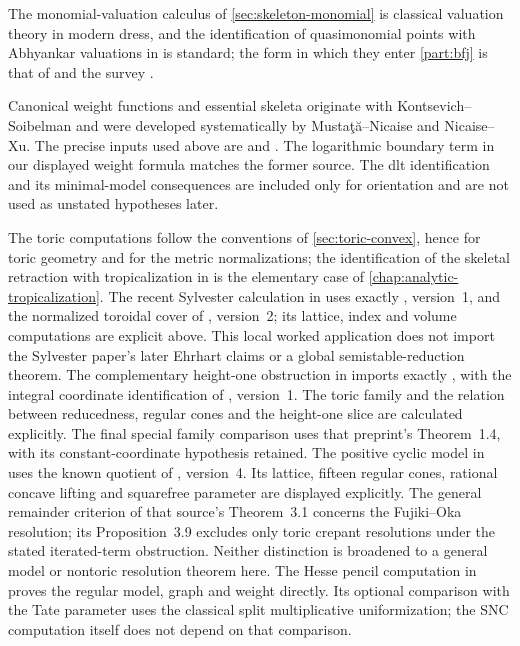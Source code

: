 The monomial-valuation calculus of \cref{sec:skeleton-monomial} is classical
valuation theory in modern dress, and the identification of quasimonomial
points with Abhyankar valuations in
 is standard; the form in which they
enter \cref{part:bfj} is that of \cite{BFJ15,BFJ16} and the survey
\cite{BFJ16b}.

Canonical weight functions and essential skeleta originate with
Kontsevich--Soibelman and were developed systematically by
Musta\c{t}\u{a}--Nicaise and Nicaise--Xu.  The precise inputs used above are
\cite[Proposition~4.4.3, Theorem~4.7.5, Definition~4.10, and
Proposition~4.10.1]{MustataNicaise2015} and
\cite[Theorem~3.3.3]{NicaiseXu2016}.  The logarithmic boundary term in our
displayed weight formula matches the former source.  The dlt identification
and its minimal-model consequences are included only for orientation and are
not used as unstated hypotheses later.

The toric computations follow the conventions of \cref{sec:toric-convex},
hence \cite{CLS11} for toric geometry and \cite{BGPS14} for the metric
normalizations; the identification of the skeletal retraction with
tropicalization in  is the elementary case of
\cref{chap:analytic-tropicalization}.
The recent Sylvester calculation in 
uses exactly \cite[Theorem~3.5]{CCJP26Sylvester}, version~1, and the
normalized toroidal cover of
\cite[Proposition~3.7]{AmbroCyclicV2}, version~2; its lattice, index
and volume computations are explicit above. This local worked application
does not import the Sylvester paper's later Ehrhart claims or a global
semistable-reduction theorem.
The complementary height-one obstruction in
 imports exactly
\cite[Example~10]{FZ99Hilbert}, with the integral coordinate
identification of \cite[Examples~6.4--6.5]{LTTZ26HNF}, version~1.
The toric family and the relation between reducedness, regular cones
and the height-one slice are calculated explicitly. The final special
family comparison uses that preprint's Theorem~1.4, with its
constant-coordinate hypothesis retained.
The positive cyclic model in 
uses the known quotient of \cite[Example~3.10]{SS20FujikiV4},
version~4. Its lattice, fifteen regular cones, rational concave lifting
and squarefree parameter are displayed explicitly. The general
remainder criterion of that source's Theorem~3.1 concerns the
Fujiki--Oka resolution; its Proposition~3.9 excludes only toric
crepant resolutions under the stated iterated-term obstruction.
Neither distinction is broadened to a general model or nontoric
resolution theorem here.
The Hesse pencil computation in
 proves the regular model, graph and weight
directly. Its optional comparison with the Tate parameter uses the
classical split multiplicative uniformization; the SNC computation itself
does not depend on that comparison.
